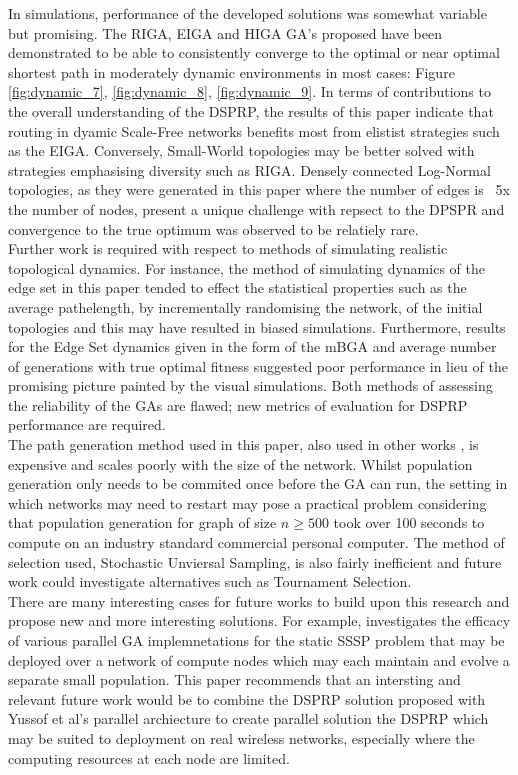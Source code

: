 \documentclass[
	a4paper, %
	10pt, %
	unnumberedsections, %
	twoside, %
]{LTJournalArticle}
\begin{document}
In simulations, performance of the developed solutions was somewhat variable but promising. The RIGA, EIGA and HIGA GA's proposed have been demonstrated to be able to consistently converge to the optimal or near optimal shortest path in moderately dynamic environments in most cases: Figure \ref{fig:dynamic_7}, \ref{fig:dynamic_8}, \ref{fig:dynamic_9}. In terms of contributions to the overall understanding of the DSPRP, the results of this paper indicate that routing in dyamic Scale-Free networks benefits most from elistist strategies such as the EIGA. Conversely, Small-World topologies may be better solved with strategies emphasising diversity such as RIGA. Densely connected Log-Normal topologies, as they were generated in this paper where the number of edges is ~5x the number of nodes, present a unique challenge with repsect to the DPSPR and convergence to the true optimum was observed to be relatiely rare. \\ 

Further work is required with respect to methods of simulating realistic topological dynamics. For instance, the method of simulating dynamics of the edge set in this paper tended to effect the statistical properties such as the average pathelength, by incrementally randomising the network, of the initial topologies and this may have resulted in biased simulations. Furthermore, results for the Edge Set dynamics given in the form of the mBGA and average number of generations with true optimal fitness suggested poor performance in lieu of the promising picture painted by the visual simulations. Both methods of assessing the reliability of the GAs are flawed; new metrics of evaluation for DSPRP performance are required. \\ 

The path generation method used in this paper, also used in other works \cite{yang:10} \cite{kumar:10} \cite{yussof:09}, is expensive and scales poorly with the size of the network. Whilst population generation only needs to be commited once before the GA can run, the setting in which networks may need to restart may pose a practical problem considering that population generation for graph of size \(n \geq 500\) took over 100 seconds to compute on an industry standard commercial personal computer. The method of selection used, Stochastic Unviersal Sampling, is also fairly inefficient and future work could investigate  alternatives such as Tournament Selection. \\

There are many interesting cases for future works to build upon this research and propose new and more interesting solutions. For example, \cite{yussof:09} investigates the efficacy of various parallel GA implemnetations for the static SSSP problem that may be deployed over a network of compute nodes which may each maintain and evolve a separate small population. This paper recommends that an intersting and relevant future work would be to combine the DSPRP solution proposed with Yussof et al's parallel archiecture to create parallel solution the DSPRP which may be suited to deployment on real wireless networks, especially where the computing resources at each node are limited. \\
\end{document}

